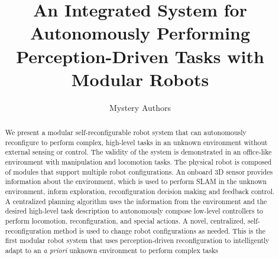 \documentclass[conference]{IEEEtran}
\begin{document}
\title{An Integrated System for Autonomously Performing Perception-Driven Tasks with Modular Robots}

\author{Mystery Authors}


\maketitle

\begin{abstract}

We present a modular self-reconfigurable robot system that can autonomously reconfigure to perform complex, high-level tasks in an unknown environment without external sensing or control. The validity of the system is demonstrated in an office-like environment with manipulation and locomotion tasks. The physical robot is composed of modules that support multiple robot configurations. An onboard 3D sensor provides information about the environment, which is used to perform SLAM in the unknown environment, inform exploration, reconfiguration decision making and feedback control.  A centralized planning algorithm uses the information from the environment and the desired high-level task description to autonomously compose low-level controllers to perform locomotion, reconfiguration, and special actions. A novel, centralized, self-reconfiguration method is used to change robot configurations as needed. This is the first modular robot system that uses perception-driven reconfiguration to intelligently adapt to an \textit{a priori} unknown environment to perform complex tasks

\end{abstract}

\IEEEpeerreviewmaketitle

\end{document}
